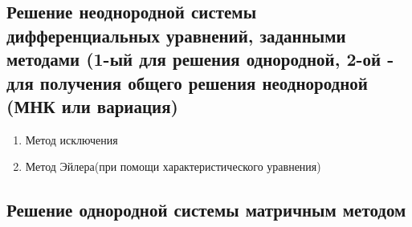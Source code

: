 \documentclass[a5paper,10pt]{article}
\begin{document}
		\subsection{Решение неоднородной системы дифференциальных уравнений, заданными методами (1-ый для решения однородной, 2-ой - для получения общего решения неоднородной (МНК или вариация)}
			\begin{enumerate}
				\item Метод исключения
				\item Метод Эйлера(при помощи характеристического уравнения)
			\end{enumerate}

		\subsection{Решение однородной системы матричным методом}
\end{document}
